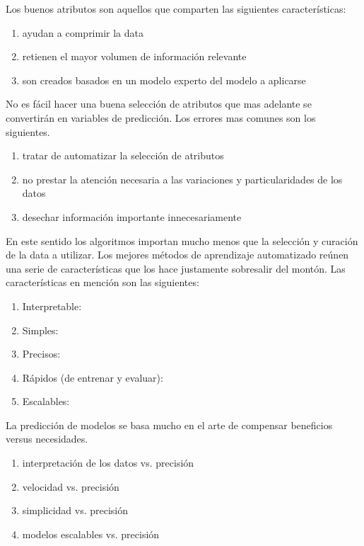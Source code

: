 \documentclass[letterpaper, spanish, 11pt]{report}
\begin{document}
Los buenos atributos son aquellos que comparten las siguientes características:

\begin{enumerate}
	\item ayudan a comprimir la data
	\item retienen el mayor volumen de información relevante
	\item son creados basados en un modelo experto del modelo a aplicarse
\end{enumerate}

No es fácil hacer una buena selección de atributos que mas adelante se convertirán en variables de predicción. Los errores mas comunes son los siguientes.

\begin{enumerate}
	\item tratar de automatizar la selección de atributos
	\item no prestar la atención necesaria a las variaciones y particularidades de los datos
	\item desechar información importante innecesariamente
\end{enumerate}

En este sentido los algoritmos importan mucho menos que la selección y curación de la data a utilizar. Los mejores métodos de aprendizaje automatizado reúnen una serie de características que los hace justamente sobresalir del montón. Las características en mención son las siguientes:

\begin{enumerate}
	\item Interpretable:
	\item Simples:
	\item Precisos:
	\item Rápidos (de entrenar y evaluar):
	\item Escalables:
\end{enumerate}

La predicción de modelos se basa mucho en el arte de compensar beneficios versus necesidades.

\begin{enumerate}
	\item interpretación de los datos vs. precisión
	\item velocidad vs. precisión
	\item simplicidad vs. precisión
	\item modelos escalables vs. precisión
\end{enumerate}
\end{document}
